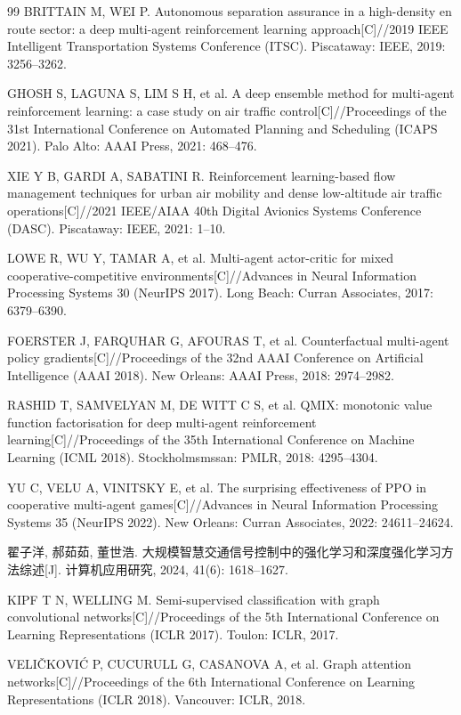 \documentclass[12pt,a4paper,UTF8]{ctexart}
\begin{document}
\begin{thebibliography}{99}
 BRITTAIN M, WEI P. Autonomous separation assurance in a high-density en route sector: a deep multi-agent reinforcement learning approach[C]//2019 IEEE Intelligent Transportation Systems Conference (ITSC). Piscataway: IEEE, 2019: 3256--3262.

 GHOSH S, LAGUNA S, LIM S H, et al. A deep ensemble method for multi-agent reinforcement learning: a case study on air traffic control[C]//Proceedings of the 31st International Conference on Automated Planning and Scheduling (ICAPS 2021). Palo Alto: AAAI Press, 2021: 468--476.

 XIE Y B, GARDI A, SABATINI R. Reinforcement learning-based flow management techniques for urban air mobility and dense low-altitude air traffic operations[C]//2021 IEEE/AIAA 40th Digital Avionics Systems Conference (DASC). Piscataway: IEEE, 2021: 1--10.

 LOWE R, WU Y, TAMAR A, et al. Multi-agent actor-critic for mixed cooperative-competitive environments[C]//Advances in Neural Information Processing Systems 30 (NeurIPS 2017). Long Beach: Curran Associates, 2017: 6379--6390.

 FOERSTER J, FARQUHAR G, AFOURAS T, et al. Counterfactual multi-agent policy gradients[C]//Proceedings of the 32nd AAAI Conference on Artificial Intelligence (AAAI 2018). New Orleans: AAAI Press, 2018: 2974--2982.

 RASHID T, SAMVELYAN M, DE WITT C S, et al. QMIX: monotonic value function factorisation for deep multi-agent reinforcement learning[C]//Proceedings of the 35th International Conference on Machine Learning (ICML 2018). Stockholmsmssan: PMLR, 2018: 4295--4304.

 YU C, VELU A, VINITSKY E, et al. The surprising effectiveness of PPO in cooperative multi-agent games[C]//Advances in Neural Information Processing Systems 35 (NeurIPS 2022). New Orleans: Curran Associates, 2022: 24611--24624.

 翟子洋, 郝茹茹, 董世浩. 大规模智慧交通信号控制中的强化学习和深度强化学习方法综述[J]. 计算机应用研究, 2024, 41(6): 1618--1627.

 KIPF T N, WELLING M. Semi-supervised classification with graph convolutional networks[C]//Proceedings of the 5th International Conference on Learning Representations (ICLR 2017). Toulon: ICLR, 2017.

 VELI\v{C}KOVI\'C P, CUCURULL G, CASANOVA A, et al. Graph attention networks[C]//Proceedings of the 6th International Conference on Learning Representations (ICLR 2018). Vancouver: ICLR, 2018.


\end{thebibliography}
\end{document}

